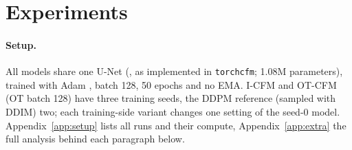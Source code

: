 \section{Experiments}\label{sec:experiments}

\paragraph{Setup.}\label{sec:setup} All models share one U-Net (\citealp{dhariwal2021adm}, as implemented in \texttt{torchcfm}; 1.08M parameters), trained with Adam \citep{kingma2015adam}, batch 128, 50 epochs and no EMA. I-CFM and OT-CFM (OT batch 128) have three training seeds, the DDPM reference (sampled with DDIM) two; each training-side variant changes one setting of the seed-0 model. Appendix~\ref{app:setup} lists all runs and their compute, Appendix~\ref{app:extra} the full analysis behind each paragraph below.

